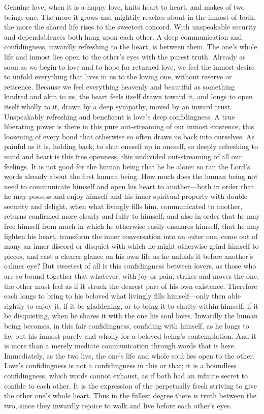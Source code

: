 \documentclass[12pt,a4paper]{book}
\begin{document}
Genuine love, when it is a happy love, knits heart to heart, and makes of
two beings one. The more it grows and mightily reaches about in the inmost
of both, the more the shared life rises to the sweetest concord. With
unspeakable security and dependableness both hang upon each other. A deep
communication and confidingness, inwardly refreshing to the heart, is
between them. The one's whole life and inmost lies open to the other's eyes
with the purest truth. Already as soon as we begin to love and to hope for
returned love, we feel the inmost desire to unfold everything that lives in
us to the loving one, without reserve or reticence. Because we feel
everything heavenly and beautiful as something kindred and akin to us, the
heart feels itself drawn toward it, and longs to open itself wholly to it,
drawn by a deep sympathy, moved by an inward trust. Unspeakably refreshing
and beneficent is love's deep confidingness. A true liberating power is
there in this pure out-streaming of our inmost existence, this loosening of
every bond that otherwise so often draws us back into ourselves. As painful
as it is, holding back, to shut oneself up in oneself, so deeply refreshing
to mind and heart is this free openness, this undivided out-streaming of
all our feelings. It is not good for the human being that he be alone: so
ran the Lord's words already about the first human being. How much does the human being not need to communicate himself and open his
heart to another---both in order that he may possess and enjoy himself and
his inner spiritual property with double security and delight, when what
livingly fills him, communicated to another, returns confirmed more clearly
and fully to himself; and also in order that he may free himself from much
in which he otherwise easily ensnares himself, that he may lighten his
heart, transform the inner conversation into an outer one, come out of many
an inner discord or disquiet with which he might otherwise grind himself to
pieces, and cast a clearer glance on his own life as he unfolds it before
another's calmer eye? But sweetest of all is this confidingness between
lovers, as those who are so bound together that whatever, with joy or pain,
strikes and moves the one, the other must feel as if it struck the dearest
part of his own existence. Therefore each longs to bring to his beloved
what livingly fills himself---only then able rightly to enjoy it, if it be
gladdening, or to bring it to clarity within himself, if it be disquieting,
when he shares it with the one his soul loves. Inwardly the human being
becomes, in this fair confidingness, confiding with himself, as he longs to
lay out his inmost purely and wholly for a beloved being's contemplation.
And it is more than a merely mediate communication through words that is
here. Immediately, as the two live, the one's life and whole soul lies open
to the other. Love's confidingness is not a confidingness in this or that;
it is a boundless confidingness, which words cannot exhaust, as if both had
an infinite secret to confide to each other. It is the expression of the
perpetually fresh striving to give the other one's whole heart. Thus in the
fullest degree there is truth between the two, since they inwardly rejoice
to walk and live before each other's eyes.
\end{document}
